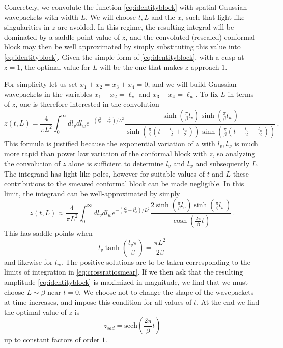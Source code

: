 \documentclass{brownthesis}
\begin{document}
Concretely, we convolute the function \eqref{eq:identityblock} with
spatial Gaussian wavepackets with width $L$. We will choose $t,L$
and the $x_{i}$ such that light-like singularities in $z$ are avoided.
In this regime, the resulting integral will be dominated by a saddle
point value of $z$, and the convoluted (rescaled) conformal block
may then be well approximated by simply substituting this value into
\eqref{eq:identityblock}. Given the simple form of \eqref{eq:identityblock},
with a cusp at $z=1$, the optimal value for $L$ will be the one
that makes $z$ approach $1$.

For simplicity let us set $x_{1}+x_{2}=x_{3}+x_{4}=0$, and we will
build Gaussian wavepackets in the variables $x_{1}-x_{2}=\ell_{v}$
and $x_{3}-x_{4}=\ell_{w}$. To fix $L$ in terms of $z$, one is
therefore interested in the convolution
\begin{equation}
z(t,L)=\frac{4}{\pi L^{2}}\int_{0}^{\infty}dl_{v}dl_{w}e^{-(l_{v}^{2}+l_{w}^{2})/L^{2}}\frac{\sinh\left(\frac{\pi}{\beta}l_{v}\right)\sinh\left(\frac{\pi}{\beta}l_{w}\right)}{\sinh\left(\frac{\pi}{\beta}\left(t-\frac{l_{v}}{2}+\frac{l_{w}}{2}\right)\right)\sinh\left(\frac{\pi}{\beta}\left(t+\frac{l_{v}}{2}-\frac{l_{w}}{2}\right)\right)}\,.\label{eq:crossratiosmear}
\end{equation}
This formula is justified because the exponential variation of $z$
with $l_{v},l_{w}$ is much more rapid than power law variation of
the conformal block with $z$, so analyzing the convolution of $z$
alone is sufficient to determine $l_{v}$ and $l_{w}$ and subsequently
$L$. The integrand has light-like poles, however for suitable values
of $t$ and $L$ these contributions to the smeared conformal block
can be made negligible. In this limit, the integrand can be well-approximated
by simply
\[
z(t,L)\approx\frac{4}{\pi L^{2}}\int_{0}^{\infty}dl_{v}dl_{w}e^{-(l_{v}^{2}+l_{w}^{2})/L^{2}}\frac{2\sinh\left(\frac{\pi}{\beta}l_{v}\right)\sinh\left(\frac{\pi}{\beta}l_{w}\right)}{\cosh\left(\frac{2\pi}{\beta}t\right)}\,.
\]
This has saddle points when
\[
l_{v}\tanh\left(\frac{l_{v}\pi}{\beta}\right)=\frac{\pi L^{2}}{2\beta}
\]
and likewise for $l_{w}$. The positive solutions are to be taken
corresponding to the limits of integration in \eqref{eq:crossratiosmear}.
If we then ask that the resulting amplitude \eqref{eq:identityblock}
is maximized in magnitude, we find that we must choose $L\sim\beta$
near $t=0$. We choose not to change the shape of the wavepackets
at time increases, and impose this condition for all values of $t$.
At the end we find the optimal value of $z$ is
\begin{equation}
z_{sad}=\mathrm{sech}\left(\frac{2\pi}{\beta}t\right)\label{eq:zsad}
\end{equation}
up to constant factors of order $1$.
\end{document}
